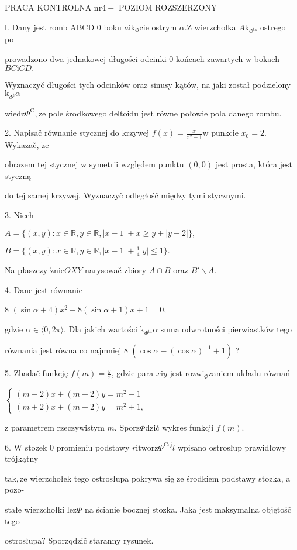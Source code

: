 \documentclass[a4paper,12pt]{article}
\begin{document}
PRACA KONTROLNA $\mathrm{n}\mathrm{r} 4-$ POZIOM ROZSZERZONY

l. Dany jest romb ABCD $0$ boku $a\mathrm{i}\mathrm{k}_{\Phi}\mathrm{c}\mathrm{i}\mathrm{e}$ ostrym $\alpha. \mathrm{Z}$ wierzcholka $A\mathrm{k}_{\Phi^{\mathrm{t}\mathrm{a}}}$ ostrego po-

prowadzono dwa jednakowej długości odcinki $0$ końcach zawartych $\mathrm{w}$ bokach $BC\mathrm{i}CD.$

Wyznaczyč długości tych odcinków oraz sinusy kątów, na jaki został podzielony $\mathrm{k}_{\Phi^{\mathrm{t}}}\alpha$

$\mathrm{w}\mathrm{i}\mathrm{e}\mathrm{d}\mathrm{z}\Phi^{\mathrm{C}}, \dot{\mathrm{z}}\mathrm{e}$ pole środkowego deltoidu jest równe połowie pola danego rombu.

2. Napisač równanie stycznej do krzywej $f(x)=\displaystyle \frac{x}{x^{2}-1} \mathrm{w}$ punkcie $x_{0} = 2$. Wykazač, $\dot{\mathrm{z}}\mathrm{e}$

obrazem tej stycznej $\mathrm{w}$ symetrii względem punktu $(0,0)$ jest prosta, która jest styczną

do tej samej krzywej. Wyznaczyč odległośč między tymi stycznymi.

3. Niech

$A=\{(x,y):x\in \mathbb{R},y\in \mathbb{R},|x-1|+x\geq y+|y-2|\},$

$B=\displaystyle \{(x,y):x\in \mathbb{R},y\in \mathbb{R},|x-1|+\frac{1}{4}|y|\leq 1\}.$

Na płaszczy $\acute{\mathrm{z}}\mathrm{n}\mathrm{i}\mathrm{e}OXY$ narysowač zbiory $A\cap B$ oraz $B'\backslash A.$

4. Dane jest równanie

8 $(\sin\alpha+4)x^{2}-8(\sin\alpha+1)x+1=0,$

gdzie $\alpha \in \langle 0,  2\pi\rangle$. Dla jakich wartości $\mathrm{k}_{\Phi^{\mathrm{t}\mathrm{a}}}\alpha$ suma odwrotności pierwiastków tego

równania jest równa co najmniej 8 $(\cos\alpha-(\cos\alpha)^{-1}+1)$ ?

5. Zbadač funkcję $f(m)=\displaystyle \frac{y}{x}$, gdzie para $x\mathrm{i}y$ jest $\mathrm{r}\mathrm{o}\mathrm{z}\mathrm{w}\mathrm{i}_{\Phi}$zaniem układu równań

$\left\{\begin{array}{l}
(m-2)x+(m+2)y=m^{2}-1\\
(m+2)x+(m-2)y=m^{2}+1,
\end{array}\right.$

$\mathrm{z}$ parametrem rzeczywistym $m$. Sporz$\Phi$dzič wykres funkcji $f(m).$

6. $\mathrm{W}$ stozek $0$ promieniu podstawy $r\mathrm{i}\mathrm{t}\mathrm{w}\mathrm{o}\mathrm{r}\mathrm{z}\Phi^{\mathrm{C}\mathrm{e}\mathrm{j}}l$ wpisano ostrosłup prawidłowy trójkątny

$\mathrm{t}\mathrm{a}\mathrm{k}, \dot{\mathrm{z}}\mathrm{e}$ wierzchołek tego ostrosłupa pokrywa się ze środkiem podstawy stozka, a pozo-

stałe wierzchołki $\mathrm{l}\mathrm{e}\mathrm{z}\Phi$ na ścianie bocznej stozka. Jaka jest maksymalna objętośč tego

ostrosłupa? Sporzqdzič staranny rysunek.
\end{document}
